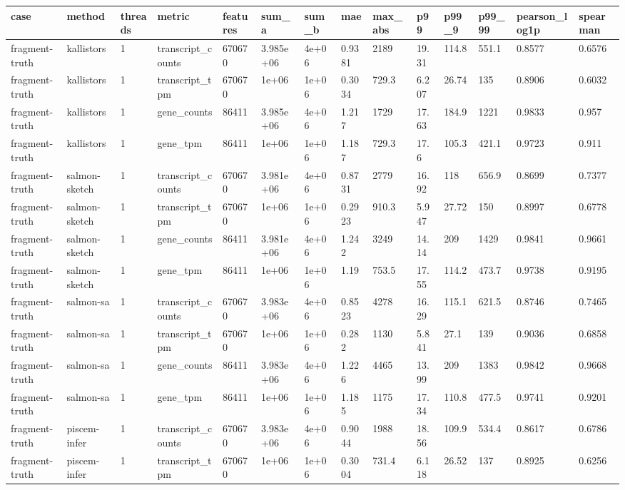 \begin{tabular}{llllllllllllll}
\toprule
case & method & threads & metric & features & sum\_a & sum\_b & mae & max\_abs & p99 & p99\_9 & p99\_99 & pearson\_log1p & spearman \\
\midrule
fragment-truth & kallistors & 1 & transcript\_counts & 670670 & 3.985e+06 & 4e+06 & 0.9381 & 2189 & 19.31 & 114.8 & 551.1 & 0.8577 & 0.6576 \\
fragment-truth & kallistors & 1 & transcript\_tpm & 670670 & 1e+06 & 1e+06 & 0.3034 & 729.3 & 6.207 & 26.74 & 135 & 0.8906 & 0.6032 \\
fragment-truth & kallistors & 1 & gene\_counts & 86411 & 3.985e+06 & 4e+06 & 1.217 & 1729 & 17.63 & 184.9 & 1221 & 0.9833 & 0.957 \\
fragment-truth & kallistors & 1 & gene\_tpm & 86411 & 1e+06 & 1e+06 & 1.187 & 729.3 & 17.6 & 105.3 & 421.1 & 0.9723 & 0.911 \\
fragment-truth & salmon-sketch & 1 & transcript\_counts & 670670 & 3.981e+06 & 4e+06 & 0.8731 & 2779 & 16.92 & 118 & 656.9 & 0.8699 & 0.7377 \\
fragment-truth & salmon-sketch & 1 & transcript\_tpm & 670670 & 1e+06 & 1e+06 & 0.2923 & 910.3 & 5.947 & 27.72 & 150 & 0.8997 & 0.6778 \\
fragment-truth & salmon-sketch & 1 & gene\_counts & 86411 & 3.981e+06 & 4e+06 & 1.242 & 3249 & 14.14 & 209 & 1429 & 0.9841 & 0.9661 \\
fragment-truth & salmon-sketch & 1 & gene\_tpm & 86411 & 1e+06 & 1e+06 & 1.19 & 753.5 & 17.55 & 114.2 & 473.7 & 0.9738 & 0.9195 \\
fragment-truth & salmon-sa & 1 & transcript\_counts & 670670 & 3.983e+06 & 4e+06 & 0.8523 & 4278 & 16.29 & 115.1 & 621.5 & 0.8746 & 0.7465 \\
fragment-truth & salmon-sa & 1 & transcript\_tpm & 670670 & 1e+06 & 1e+06 & 0.282 & 1130 & 5.841 & 27.1 & 139 & 0.9036 & 0.6858 \\
fragment-truth & salmon-sa & 1 & gene\_counts & 86411 & 3.983e+06 & 4e+06 & 1.226 & 4465 & 13.99 & 209 & 1383 & 0.9842 & 0.9668 \\
fragment-truth & salmon-sa & 1 & gene\_tpm & 86411 & 1e+06 & 1e+06 & 1.185 & 1175 & 17.34 & 110.8 & 477.5 & 0.9741 & 0.9201 \\
fragment-truth & piscem-infer & 1 & transcript\_counts & 670670 & 3.983e+06 & 4e+06 & 0.9044 & 1988 & 18.56 & 109.9 & 534.4 & 0.8617 & 0.6786 \\
fragment-truth & piscem-infer & 1 & transcript\_tpm & 670670 & 1e+06 & 1e+06 & 0.3004 & 731.4 & 6.118 & 26.52 & 137 & 0.8925 & 0.6256 \\

\end{tabular}
